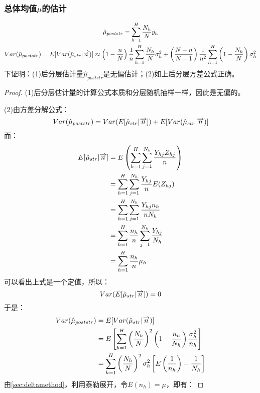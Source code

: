 \subsubsection{总体均值$\mu$的估计}
\begin{gather*}
	\hat{\mu}_{poststr}=\sum_{h=1}^H\frac{N_h}{N}\bar{y}_h \\
	Var(\hat{\mu}_{poststr})=E[Var(\hat{\mu}_{str}\arrowvert\overrightarrow{n})]\approx\left(1-\frac{n}{N}\right)\frac{1}{n}\sum_{h=1}^H\frac{N_h}{N}\sigma_h^2+\left(\frac{N-n}{N-1}\right)\frac{1}{n^2}\sum_{h=1}^H\left(1-\frac{N_h}{N}\right)\sigma_h^2
\end{gather*}
下证明：(1)后分层估计量$\hat{\mu}_{poststr}$是无偏估计；(2)如上后分层方差公式正确。
\begin{proof}
	(1)后分层估计量的计算公式本质和分层随机抽样一样，因此是无偏的。\par
	(2)由方差分解公式：
	\begin{equation*}
		Var(\hat{\mu}_{poststr})=Var(E[\hat{\mu}_{str}\arrowvert\overrightarrow{n}])+E[Var(\hat{\mu}_{str}\arrowvert\overrightarrow{n})]
	\end{equation*}
	而：
	\begin{align*}
		E[\hat{\mu}_{str}\arrowvert\overrightarrow{n}]
		&=E\left(\sum_{h=1}^H\sum_{j=1}^{N_h}\frac{Y_{hj}Z_{hj}}{n}\right) \\
		&=\sum_{h=1}^H\sum_{j=1}^{N_h}\frac{Y_{hj}}{n}E(Z_{hj}) \\
		&=\sum_{h=1}^H\sum_{j=1}^{N_h}\frac{Y_{hj}n_h}{nN_h} \\
		&=\sum_{h=1}^H\frac{n_h}{n}\sum_{j=1}^{N_h}\frac{Y_{hj}}{N_h} \\
		&=\sum_{h=1}^H\frac{n_h}{n}\mu_h \\
	\end{align*}
	可以看出上式是一个定值，所以：
	\begin{equation*}
		Var(E[\hat{\mu}_{str}\arrowvert\overrightarrow{n}])=0
	\end{equation*}
	于是：
	\begin{align*}
		Var(\hat{\mu}_{poststr})
		&=E[Var(\hat{\mu}_{str}\arrowvert\overrightarrow{n})] \\
		&=E\left[\sum_{h=1}^H\left(\frac{N_h}{N}\right)^2\left(1-\frac{n_h}{N_h}\right)\frac{\sigma_h^2}{n_h}\right] \\
		&=\sum_{h=1}^H\left(\frac{N_h}{N}\right)^2\sigma_h^2\left[E\left(\frac{1}{n_h}\right)-\frac{1}{N_h}\right] \\
	\end{align*}
	由\cref{sec:deltamethod}，利用泰勒展开，令$E(n_h)=\mu$，即有：

\end{proof}
